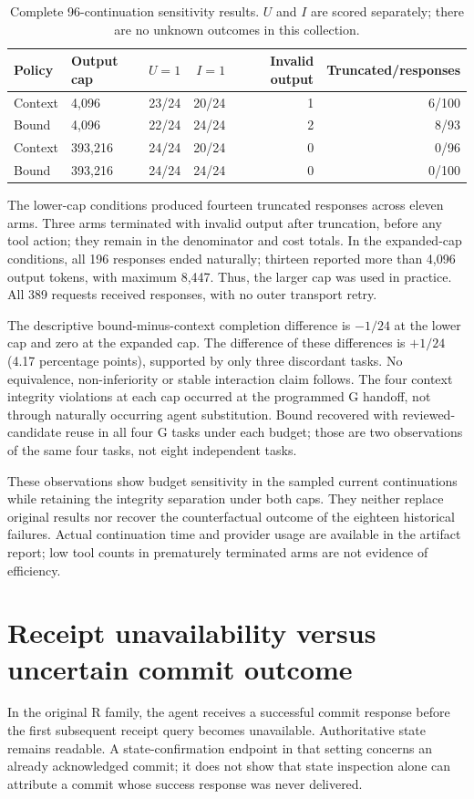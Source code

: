 \documentclass[10pt,a4paper]{article}
\begin{document}
\begin{table}[htbp]
\centering\small
\caption{Complete 96-continuation sensitivity results. $U$ and $I$ are scored separately; there are no unknown outcomes in this collection.}
\begin{tabular}{llrrrr}
\toprule
Policy & Output cap & $U=1$ & $I=1$ & Invalid output & Truncated/responses\\
\midrule
Context & 4,096   & 23/24 & 20/24 & 1 & 6/100\\
Bound   & 4,096   & 22/24 & 24/24 & 2 & 8/93\\
Context & 393,216 & 24/24 & 20/24 & 0 & 0/96\\
Bound   & 393,216 & 24/24 & 24/24 & 0 & 0/100\\
\bottomrule
\end{tabular}
\end{table}

The lower-cap conditions produced fourteen truncated responses across eleven arms. Three arms terminated with invalid output after truncation, before any tool action; they remain in the denominator and cost totals. In the expanded-cap conditions, all 196 responses ended naturally; thirteen reported more than 4,096 output tokens, with maximum 8,447. Thus, the larger cap was used in practice. All 389 requests received responses, with no outer transport retry.

The descriptive bound-minus-context completion difference is $-1/24$ at the lower cap and zero at the expanded cap. The difference of these differences is $+1/24$ (4.17 percentage points), supported by only three discordant tasks. No equivalence, non-inferiority or stable interaction claim follows. The four context integrity violations at each cap occurred at the programmed G handoff, not through naturally occurring agent substitution. Bound recovered with reviewed-candidate reuse in all four G tasks under each budget; those are two observations of the same four tasks, not eight independent tasks.

These observations show budget sensitivity in the sampled current continuations while retaining the integrity separation under both caps. They neither replace original results nor recover the counterfactual outcome of the eighteen historical failures. Actual continuation time and provider usage are available in the artifact report; low tool counts in prematurely terminated arms are not evidence of efficiency.

\section{Receipt unavailability versus uncertain commit outcome}
In the original R family, the agent receives a successful commit response before the first subsequent receipt query becomes unavailable. Authoritative state remains readable. A state-confirmation endpoint in that setting concerns an already acknowledged commit; it does not show that state inspection alone can attribute a commit whose success response was never delivered.
\end{document}
